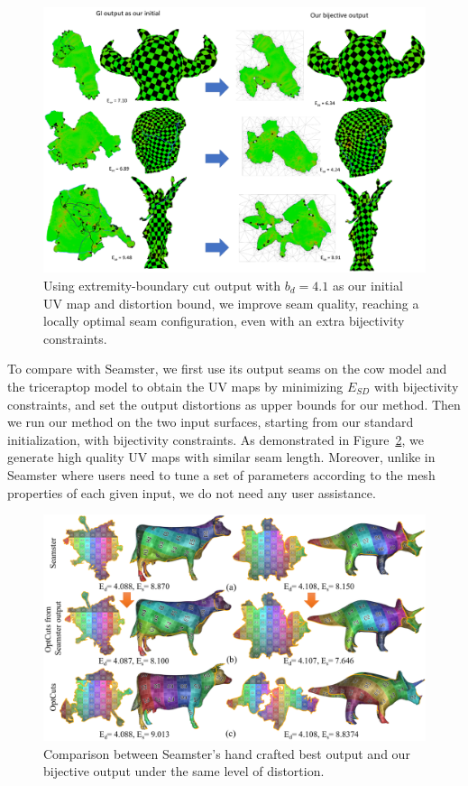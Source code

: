 \begin{figure}[!h]
\centering
\includegraphics[width=\linewidth]{fig/comp_GI_outputAsInit.png}
\caption{Using extremity-boundary cut output with $b_d = 4.1$ as our initial UV map and distortion bound, we improve seam quality, reaching a locally optimal seam configuration, even with an extra bijectivity constraints.}
\label{fig:comp_GI_outputAsInit}
\end{figure}

To compare with Seamster, we first use its output seams on the cow model and the triceraptop model to obtain the UV maps by minimizing $E_{SD}$ with bijectivity constraints, and set the output distortions as upper bounds for our method. Then we run our method on the two input surfaces, starting from our standard initialization, with bijectivity constraints. As demonstrated in Figure~\ref{fig:comp_Seamster}, we generate high quality UV maps with similar seam length. Moreover, unlike in Seamster where users need to tune a set of parameters according to the mesh properties of each given input, we do not need any user assistance.  

\begin{figure}[!h]
\centering
\includegraphics[width=\linewidth]{fig/comp_Seamster.png}
\caption{Comparison between Seamster's hand crafted best output and our bijective output under the same level of distortion.}
\label{fig:comp_Seamster}
\end{figure}
